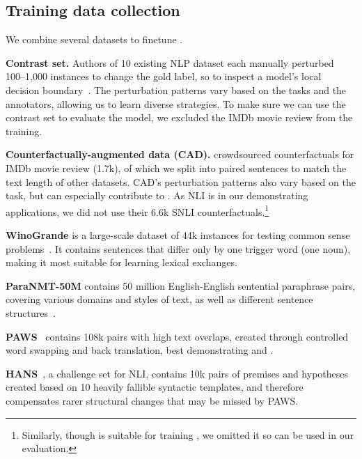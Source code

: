 \subsection{Training data collection}


We combine several datasets to finetune \sysname.

\textbf{Contrast set.}
Authors of 10 existing NLP dataset each manually perturbed 100--1,000 instances to change the gold label, so to inspect a model's local decision boundary~\cite{gardner2020contrast}.
The perturbation patterns vary based on the tasks and the annotators, allowing us to learn diverse strategies.
To make sure we can use the contrast set to evaluate the \sst model, we excluded the IMDb movie review from the training.


\textbf{Counterfactually-augmented data (CAD).}
\citet{kaushik2019learning} crowdsourced counterfactuals for IMDb movie review (1.7k), of which we split into paired sentences to match the text length of other datasets.
CAD's perturbation patterns also vary based on the task, but can especially contribute to .
As NLI is in our demonstrating applications, we did not use their 6.6k SNLI counterfactuals.\footnote{Similarly, though \qqp is suitable for training \sysname, we omitted it so \qqp can be used in our evaluation.}


\textbf{WinoGrande} is a large-scale dataset of 44k instances for testing common sense problems~\cite{sakaguchi2019winogrande}.
It contains sentences that differ only by one trigger word (\eg one noun), making it most suitable for learning lexical exchanges.

\textbf{ParaNMT-50M} contains 50 million English-English sentential paraphrase pairs, covering various domains and styles of text, as well as different sentence structures~\cite{wieting2017paranmt}. 

\textbf{PAWS}~\cite{zhang2019paws} contains 108k pairs with high text overlaps, created through controlled word swapping and back translation, best demonstrating  and .


\textbf{HANS}~\cite{mccoy2019right}, a challenge set for NLI, contains 10k pairs of premises and hypotheses created based on 10 heavily fallible syntactic templates, and therefore compensates rarer structural changes that may be missed by PAWS.


